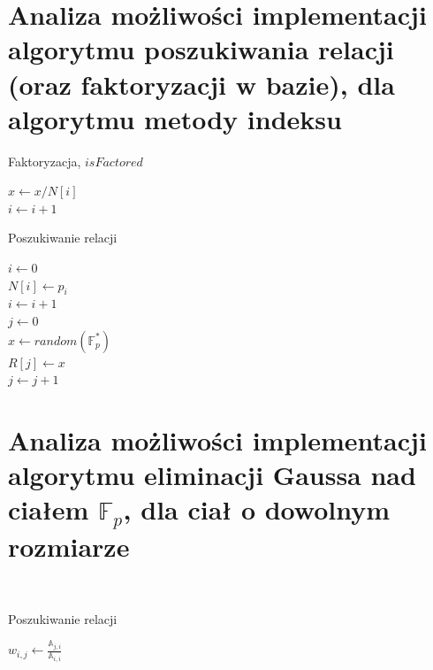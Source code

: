 \documentclass[]{article}
\begin{document}
\section{Analiza możliwości implementacji algorytmu poszukiwania relacji (oraz faktoryzacji w bazie), dla algorytmu metody indeksu}

\begin{algorithm}
	\SetAlgoLined
	\caption{Faktoryzacja, \(isFactored\)}
	\label{Faktor}
	{
		{
			\(x \gets x/N[i]\)\\
		}
		\(i \gets i + 1\)
	}
	{
	}
\end{algorithm}

\begin{algorithm}
	\SetAlgoLined
	\caption{Poszukiwanie relacji}
	\label{Relation}
	\(i \gets 0\) \\
	{
		\(N[i] \gets p_i\)\\
		\(i \gets i + 1\)\\
	}
	\(j \gets 0\) \\
	{
		\(x \gets random(\mathbb{F}_p^*)\)\\
		{
			\(R[j] \gets x\)\\
			\(j \gets j + 1\)\\
		}
	}
\end{algorithm}


\section{Analiza możliwości implementacji algorytmu eliminacji Gaussa nad ciałem $\mathbb{F}_p$, dla ciał o dowolnym rozmiarze}~
	\begin{algorithm}
		\SetAlgoLined
		\caption{Poszukiwanie relacji}
		\label{Gauss}
		{
			\(w_{i,j} \gets \frac{\mathbb{A}_{j,i}}{\mathbb{A}_{i,i}}\)\\
			{
				\(\)
			}
		}

	\end{algorithm}
\end{document}
